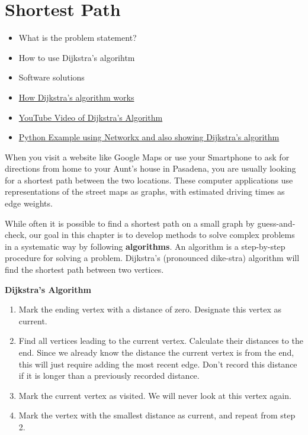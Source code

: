 \section{Shortest Path}
\begin{outcome}
\begin{itemize}
\item What is the problem statement?
\item How to use Dijkstra's algorihtm
\item Software solutions
\end{itemize}
\end{outcome}
\begin{resource}
\begin{itemize}
\item \href{https://www.youtube.com/watch?v=EFg3u_E6eHU&ab_channel=SpanningTree}{How Dijkstra's algorithm works}
\item \href{https://youtu.be/EFg3u_E6eHU}{YouTube Video of Dijkstra's Algorithm}
\item \href{https://github.com/open-optimization/open-optimization-or-book/blob/master/instructive-code/networkx%20example%20-%20Dijkstra's%20Algorithm.ipynb}{Python Example using Networkx and also showing Dijkstra's algorithm}
\end{itemize}
\end{resource}
When you visit a website like Google Maps or use your Smartphone to ask for directions from home to your Aunt's house in Pasadena, you are usually looking for a shortest path between the two locations.  These computer applications use representations of the street maps as graphs, with estimated driving times as edge weights.

While often it is possible to find a shortest path on a small graph by guess-and-check, our goal in this chapter is to develop methods to solve complex problems in a systematic way by following \textbf{algorithms}.  An algorithm is a step-by-step procedure for solving a problem.  Dijkstra's (pronounced dike-stra) algorithm will find the shortest path between two vertices.


{\Large \textbf{Dijkstra's Algorithm} } \\
\hspace{3in}

\begin{enumerate}
\item	Mark the ending vertex with a distance of zero.  Designate this vertex as current.
\item Find all vertices leading to the current vertex.  Calculate their distances to the end.  Since we already know the distance the current vertex is from the end, this will just require adding the most recent edge.  Don't record this distance if it is longer than a previously recorded distance.
\item	Mark the current vertex as visited.  We will never look at this vertex again.
\item	Mark the vertex with the smallest distance as current, and repeat from step 2.
\end{enumerate}

